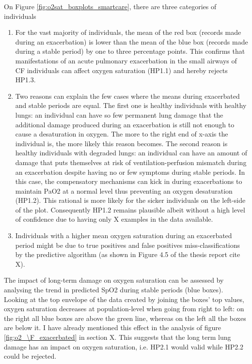On Figure \ref{fig:o2sat_boxplots_smartcare}, there are three categories of individuals
\begin{enumerate}
    \item For the vast majority of individuals, the mean of the red box (records made during an exacerbation) is lower than the mean of the blue box (records made during a stable period) by one to three percentage points. This confirms that manifestations of an acute pulmonary exacerbation in the small airways of CF individuals can affect oxygen saturation (HP1.1) and hereby rejects HP1.3.
    \item Two reasons can explain the few cases where the means during exacerbated and stable periods are equal. The first one is healthy individuals with healthy lungs: an individual can have so few permanent lung damage that the additional damage produced during an exacerbation is still not enough to cause a desaturation in oxygen. The more to the right end of x-axis the individual is, the more likely this reason becomes. The second reason is healthy individuals with degraded lungs: an individual can have an amount of damage that puts themselves at risk of ventilation-perfusion mismatch during an exacerbation despite having no or few symptoms during stable periods. In this case, the compensatory mechanisms can kick in during exacerbations to maintain PaO2 at a normal level thus preventing an oxygen desaturation (HP1.2). This rational is more likely for the sicker individuals on the left-side of the plot. Consequently HP1.2 remains plausible albeit without a high level of confidence due to having only X examples in the data available.
    \item Individuals with a higher mean oxygen saturation during an exacerbated period might be due to true positives and false positives miss-classifications by the predictive algorithm (as shown in Figure 4.5 of the thesis report cite X).
\end{enumerate}

The impact of long-term damage on oxygen saturation can be assessed by analysing the trend in predicted SpO2 during stable periods (blue boxes). Looking at the top envelope of the data created by joining the boxes' top values, oxygen saturation decreases at population-level when going from right to left: on the right all blue boxes are above the green line, whereas on the left all the boxes are below it. I have already mentioned this effect in the analysis of figure \ref{fig:o2_\F_exacerbated} in section X. This suggests that the long term lung damage has an impact on oxygen saturation, i.e.  HP2.1 would valid while HP2.2 could be rejected.

